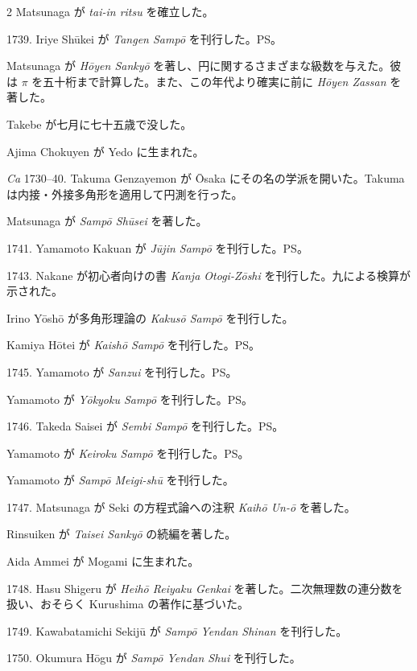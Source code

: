 \documentclass[11pt]{article}
\newcommand{\scanfooter}{}
\begin{document}
\begin{multicols}{2}
Matsunaga が \emph{tai-in ritsu} を確立した。

1739. Iriye Shūkei が \emph{Tangen Sampō} を刊行した。PS。

Matsunaga が \emph{Hōyen Sankyō} を著し、円に関するさまざまな級数を与えた。彼は $\pi$ を五十桁まで計算した。また、この年代より確実に前に \emph{Hōyen Zassan} を著した。

Takebe が七月に七十五歳で没した。

Ajima Chokuyen が Yedo に生まれた。

\emph{Ca} 1730--40. Takuma Genzayemon が Ōsaka にその名の学派を開いた。Takuma は内接・外接多角形を適用して円測を行った。

Matsunaga が \emph{Sampō Shūsei} を著した。

1741. Yamamoto Kakuan が \emph{Jūjin Sampō} を刊行した。PS。

1743. Nakane が初心者向けの書 \emph{Kanja Otogi-Zōshi} を刊行した。九による検算が示された。

Irino Yōshō が多角形理論の \emph{Kakusō Sampō} を刊行した。

Kamiya Hōtei が \emph{Kaishō Sampō} を刊行した。PS。

1745. Yamamoto が \emph{Sanzui} を刊行した。PS。

Yamamoto が \emph{Yōkyoku Sampō} を刊行した。PS。

1746. Takeda Saisei が \emph{Sembi Sampō} を刊行した。PS。

Yamamoto が \emph{Keiroku Sampō} を刊行した。PS。

Yamamoto が \emph{Sampō Meigi-shū} を刊行した。

1747. Matsunaga が Seki の方程式論への注釈 \emph{Kaihō Un-ō} を著した。

Rinsuiken が \emph{Taisei Sankyō} の続編を著した。

Aida Ammei が Mogami に生まれた。

1748. Hasu Shigeru が \emph{Heihō Reiyaku Genkai} を著した。二次無理数の連分数を扱い、おそらく Kurushima の著作に基づいた。

1749. Kawabatamichi Sekijū が \emph{Sampō Yendan Shinan} を刊行した。

1750. Okumura Hōgu が \emph{Sampō Yendan Shui} を刊行した。
\end{multicols}
\scanfooter
\end{document}
